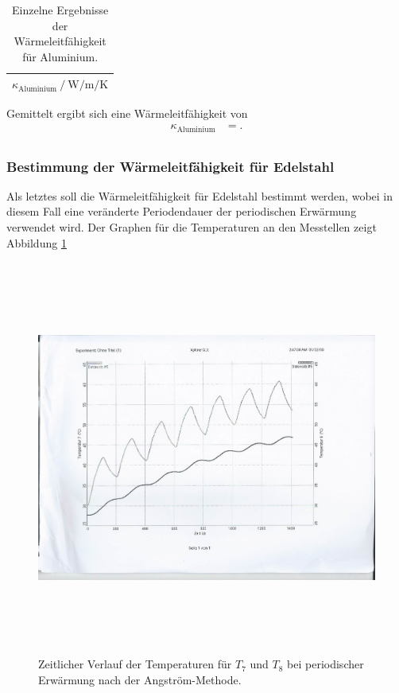 \begin{table}
  \centering
  \caption{Einzelne Ergebnisse der Wärmeleitfähigkeit für Aluminium.}
  \label{tab:6}
  \begin{tabular}{c}
    \toprule
    {$\kappa_\text{Aluminium} \:/\: \si{\watt\per\metre\per\kelvin}$}\\
    \midrule
    
    \bottomrule
  \end{tabular}
\end{table}
Gemittelt ergibt sich eine Wärmeleitfähigkeit von
\begin{align*}
  \kappa_\text{Aluminium} &= . \\
\end{align*}

\subsubsection{Bestimmung der Wärmeleitfähigkeit für Edelstahl}
Als letztes soll die Wärmeleitfähigkeit für Edelstahl bestimmt werden, wobei in diesem Fall eine veränderte Periodendauer der periodischen Erwärmung verwendet wird.
Der Graphen für die Temperaturen an den Messtellen zeigt Abbildung \ref{fig:7}
\begin{figure}
  \centering
  \includegraphics[height=13cm]{scan-1.jpg}
  \caption{Zeitlicher Verlauf der Temperaturen für $T_7$ und $T_8$ bei periodischer Erwärmung nach der Angström-Methode.}
  \label{fig:7}
\end{figure}
